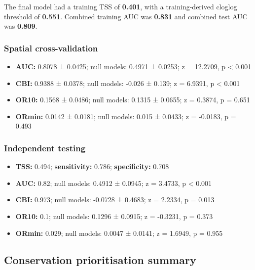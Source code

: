 \documentclass[
  openany]{book}
\providecommand{\tightlist}{%
  \setlength{\itemsep}{0pt}\setlength{\parskip}{0pt}}
\providecommand{\tightlist}{%
  \setlength{\itemsep}{0pt}%
  \setlength{\parskip}{0pt}%
}
\begin{document}
The final model had a training TSS of \textbf{0.401}, with a training-derived cloglog threshold of \textbf{0.551}. Combined training AUC was \textbf{0.831} and combined test AUC was \textbf{0.809}.

\subsubsection*{Spatial cross-validation}\label{spatial-cross-validation-2}

\begin{itemize}
\tightlist
\item
  \textbf{AUC:} 0.8078 ± 0.0425; null models: 0.4971 ± 0.0253; z = 12.2709, p \textless{} 0.001
\item
  \textbf{CBI:} 0.9388 ± 0.0378; null models: -0.026 ± 0.139; z = 6.9391, p \textless{} 0.001
\item
  \textbf{OR10:} 0.1568 ± 0.0486; null models: 0.1315 ± 0.0655; z = 0.3874, p = 0.651
\item
  \textbf{ORmin:} 0.0142 ± 0.0181; null models: 0.015 ± 0.0433; z = -0.0183, p = 0.493
\end{itemize}

\subsubsection*{Independent testing}\label{independent-testing-2}

\begin{itemize}
\tightlist
\item
  \textbf{TSS:} 0.494; \textbf{sensitivity:} 0.786; \textbf{specificity:} 0.708
\item
  \textbf{AUC:} 0.82; null models: 0.4912 ± 0.0945; z = 3.4733, p \textless{} 0.001
\item
  \textbf{CBI:} 0.973; null models: -0.0728 ± 0.4683; z = 2.2334, p = 0.013
\item
  \textbf{OR10:} 0.1; null models: 0.1296 ± 0.0915; z = -0.3231, p = 0.373
\item
  \textbf{ORmin:} 0.029; null models: 0.0047 ± 0.0141; z = 1.6949, p = 0.955
\end{itemize}

\subsection*{Conservation prioritisation summary}\label{conservation-prioritisation-summary-2}
\end{document}
